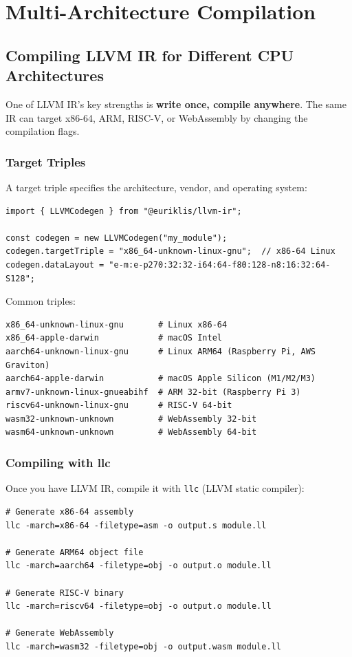 \documentclass[11pt,oneside]{book}
\begin{document}
\part{Multi-Architecture Compilation}

\chapter{Compiling LLVM IR for Different CPU Architectures}

One of LLVM IR's key strengths is \textbf{write once, compile anywhere}. The same IR can target x86-64, ARM, RISC-V, or WebAssembly by changing the compilation flags.

\section{Target Triples}

A target triple specifies the architecture, vendor, and operating system:

\begin{lstlisting}[style=ts]
import { LLVMCodegen } from "@euriklis/llvm-ir";

const codegen = new LLVMCodegen("my_module");
codegen.targetTriple = "x86_64-unknown-linux-gnu";  // x86-64 Linux
codegen.dataLayout = "e-m:e-p270:32:32-i64:64-f80:128-n8:16:32:64-S128";
\end{lstlisting}

Common triples:
\begin{lstlisting}[style=ir]
x86_64-unknown-linux-gnu       # Linux x86-64
x86_64-apple-darwin            # macOS Intel
aarch64-unknown-linux-gnu      # Linux ARM64 (Raspberry Pi, AWS Graviton)
aarch64-apple-darwin           # macOS Apple Silicon (M1/M2/M3)
armv7-unknown-linux-gnueabihf  # ARM 32-bit (Raspberry Pi 3)
riscv64-unknown-linux-gnu      # RISC-V 64-bit
wasm32-unknown-unknown         # WebAssembly 32-bit
wasm64-unknown-unknown         # WebAssembly 64-bit
\end{lstlisting}

\section{Compiling with llc}

Once you have LLVM IR, compile it with \texttt{llc} (LLVM static compiler):

\begin{lstlisting}[style=ir]
# Generate x86-64 assembly
llc -march=x86-64 -filetype=asm -o output.s module.ll

# Generate ARM64 object file
llc -march=aarch64 -filetype=obj -o output.o module.ll

# Generate RISC-V binary
llc -march=riscv64 -filetype=obj -o output.o module.ll

# Generate WebAssembly
llc -march=wasm32 -filetype=obj -o output.wasm module.ll
\end{lstlisting}
\end{document}

